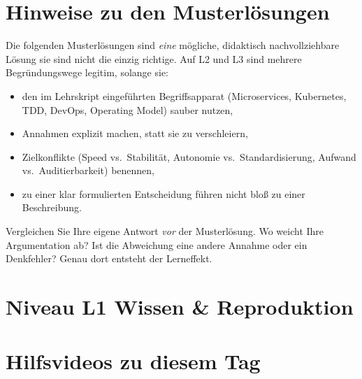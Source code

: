 \documentclass[11pt,a4paper,oneside]{article}
\begin{document}
\section*{Hinweise zu den Musterl\"osungen}
\thispagestyle{plain}

\noindent Die folgenden Musterl\"osungen sind \emph{eine} m\"ogliche, didaktisch nachvollziehbare L\"osung \textendash{} sie sind nicht die einzig richtige. Auf L2 und L3 sind mehrere Begr\"undungswege legitim, solange sie:

\begin{itemize}
  \item den im Lehrskript eingef\"uhrten Begriffsapparat (Microservices, Kubernetes, TDD, DevOps, Operating Model) sauber nutzen,
  \item Annahmen explizit machen, statt sie zu verschleiern,
  \item Zielkonflikte (Speed vs.\ Stabilit\"at, Autonomie vs.\ Standardisierung, Aufwand vs.\ Auditierbarkeit) benennen,
  \item zu einer klar formulierten Entscheidung f\"uhren \textendash{} nicht blo{\ss} zu einer Beschreibung.
\end{itemize}

\begin{infobox}
Vergleichen Sie Ihre eigene Antwort \emph{vor} der Musterl\"osung. Wo weicht Ihre Argumentation ab? Ist die Abweichung eine andere Annahme \textendash{} oder ein Denkfehler? Genau dort entsteht der Lerneffekt.
\end{infobox}

\clearpage

\section*{Niveau L1 \textendash{} Wissen \& Reproduktion}

\section*{Hilfsvideos zu diesem Tag}
\thispagestyle{plain}
\end{document}
